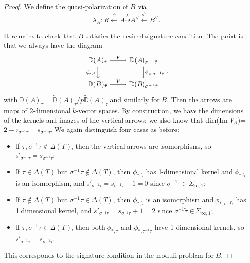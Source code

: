 \documentclass{article}
\begin{document}
\begin{proof}
We define the quasi-polarization of $B$ via
\begin{equation}
\lambda_B:B\xleftarrow{\phi} A\stackrel{\lambda}{\dashrightarrow} A^\vee\xleftarrow{\phi^\vee}B^\vee.
\end{equation}

It remains to check that $B$ satisfies the desired signature condition. The point is that we always have the diagram
\begin{equation}
\begin{tikzcd}
{\mathbb{D}}(A)_{\tilde\tau} \arrow[r, "V"] \arrow[d, "{\phi_{\ast,\tilde\tau}}"'] & {\mathbb{D}}(A)_{\sigma^{-1}\tilde\tau} \arrow[d, "{\phi_{\ast,\sigma^{-1}\tilde\tau}}"]  \\
{\mathbb{D}}(B)_{\tilde\tau} \arrow[r, "V"]  & {\mathbb{D}}(B)_{\sigma^{-1}\tilde\tau}
\end{tikzcd}.
\end{equation}
with $\mathbb{D}(A)_{\tilde\tau}=\tilde{\mathbb{D}}(A)_{\tilde\tau}/p\tilde{\mathbb{D}}(A)_{\tilde\tau}$ and similarly for $B$. Then the arrows are maps of $2$-dimensional $k$-vector spaces. By construction, we have the dimensions of the kernels and images of the vertical arrows; we also know that dim(Im $V_A$)=$2-r_{\sigma^{-1}\tau}=s_{\sigma^{-1}\tau}$. We again distinguish four cases as before:
\begin{itemize}
	\item If $\tau,\sigma^{-1}\tau\notin \Delta(T)$, then the vertical arrows are isomorphisms, so $s'_{\sigma^{-1}\tau}=s_{\sigma^{-1}\tau}$;
	\item If $\tau\in\Delta(T)$ but $\sigma^{-1}\tau\notin\Delta(T)$, then $\phi_{\ast,\tilde\tau}$ has 1-dimensional kernel and $\phi_{\ast,\tilde\tau}$ is an isomorphism, and $s'_{\sigma^{-1}\tau}=s_{\sigma^{-1}\tau}-1=0$ since $\sigma^{-1}\tilde\tau\in \Sigma_{\infty,1}$;
	\item If $\tau\notin\Delta(T)$ but $\sigma^{-1}\tau\in\Delta(T)$, then $\phi_{\ast,\tilde\tau}$ is an isomorphism and $\phi_{\ast,\sigma^{-1}\tilde\tau}$ has 1 dimensional kernel, and $s'_{\sigma^{-1}\tau}=s_{\sigma^{-1}\tau}+1=2$ since $\sigma^{-1}\tilde\tau\in \Sigma_{\infty,1}$;
	\item If $\tau,\sigma^{-1}\tau\in\Delta(T)$, then both $\phi_{\ast,\tilde\tau}$ and $\phi_{\ast,\sigma^{-1}\tilde\tau}$ have 1-dimensional kernels, so $s'_{\sigma^{-1}\tau}=s_{\sigma^{-1}\tau}$.
\end{itemize}
This corresponds to the signature condition in the moduli problem for $B$.


\end{proof}
\end{document}
